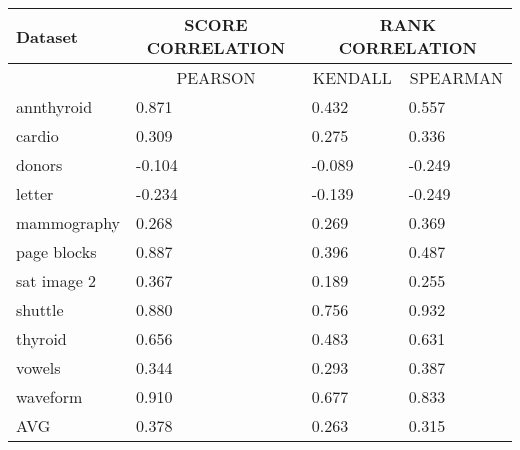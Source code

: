  \begin{table}[]
\begin{tabular}{|l|l|ll|}
\hline
Dataset     & \multicolumn{1}{c|}{SCORE CORRELATION} & \multicolumn{2}{c|}{RANK CORRELATION}                        \\ \hline
            & \multicolumn{1}{c|}{PEARSON}           & \multicolumn{1}{c|}{KENDALL} & \multicolumn{1}{c|}{SPEARMAN} \\ \hline
annthyroid  & 0.871                                  & \multicolumn{1}{l|}{0.432}   & 0.557                         \\ \hline
cardio      & 0.309                                  & \multicolumn{1}{l|}{0.275}   & 0.336                         \\ \hline
donors      & -0.104                                 & \multicolumn{1}{l|}{-0.089}  & -0.249                        \\ \hline
letter      & -0.234                                 & \multicolumn{1}{l|}{-0.139}  & -0.249                        \\ \hline
mammography & 0.268                                  & \multicolumn{1}{l|}{0.269}   & 0.369                         \\ \hline
page blocks & 0.887                                  & \multicolumn{1}{l|}{0.396}   & 0.487                         \\ \hline
sat image 2 & 0.367                                  & \multicolumn{1}{l|}{0.189}   & 0.255                         \\ \hline
shuttle     & 0.880                                  & \multicolumn{1}{l|}{0.756}   & 0.932                         \\ \hline
thyroid     & 0.656                                  & \multicolumn{1}{l|}{0.483}   & 0.631                         \\ \hline
vowels      & 0.344                                  & \multicolumn{1}{l|}{0.293}   & 0.387                         \\ \hline
waveform    & 0.910                                  & \multicolumn{1}{l|}{0.677}   & 0.833                         \\ \hline
AVG         & 0.378                                  & \multicolumn{1}{l|}{0.263}   & 0.315                         \\ \hline
\end{tabular}
\end{table}


